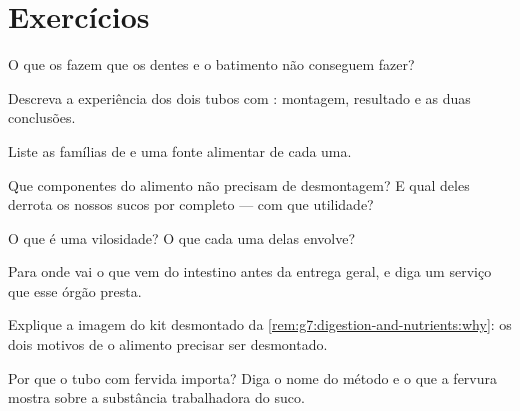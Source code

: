 \section{Exercícios}

\begin{exercise}[$\star$]\label{exo:g7:digestion-and-nutrients:1}
O que os  fazem que os dentes e o batimento não
conseguem fazer?
\end{exercise}

\begin{exercise}[$\star$]\label{exo:g7:digestion-and-nutrients:2}
Descreva a experiência dos dois tubos com : montagem, resultado
e as duas conclusões.
\end{exercise}

\begin{exercise}[$\star$]\label{exo:g7:digestion-and-nutrients:3}
Liste as famílias de  e uma fonte alimentar de cada uma.
\end{exercise}

\begin{exercise}[$\star$]\label{exo:g7:digestion-and-nutrients:4}
Que componentes do alimento não precisam de desmontagem? E qual deles
derrota os nossos sucos por completo --- com que utilidade?
\end{exercise}

\begin{exercise}[$\star$]\label{exo:g7:digestion-and-nutrients:5}
O que é uma vilosidade? O que cada uma delas envolve?
\end{exercise}

\begin{exercise}[$\star$]\label{exo:g7:digestion-and-nutrients:6}
Para onde vai o  que vem do intestino antes da entrega geral, e
diga um serviço que esse órgão presta.
\end{exercise}

\begin{exercise}[$\star\star$]\label{exo:g7:digestion-and-nutrients:7}
Explique a imagem do kit desmontado da
\cref{rem:g7:digestion-and-nutrients:why}: os dois motivos de o
alimento precisar ser desmontado.
\end{exercise}

\begin{exercise}[$\star\star$]\label{exo:g7:digestion-and-nutrients:8}
Por que o tubo com  fervida importa? Diga o nome do método e o
que a fervura mostra sobre a substância trabalhadora do suco.
\end{exercise}

